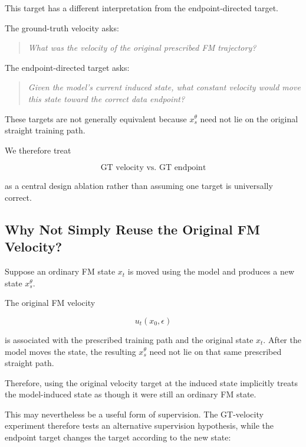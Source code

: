 \documentclass[11pt]{article}
\begin{document}
This target has a different interpretation from the endpoint-directed target.

The ground-truth velocity asks:

\begin{quote}
\emph{What was the velocity of the original prescribed FM trajectory?}
\end{quote}

The endpoint-directed target asks:

\begin{quote}
\emph{Given the model's current induced state, what constant velocity would
move this state toward the correct data endpoint?}
\end{quote}

These targets are not generally equivalent because $x_s^\theta$ need not lie on
the original straight training path.

We therefore treat

\begin{equation}
\boxed{
\text{GT velocity vs. GT endpoint}
}
\end{equation}

as a central design ablation rather than assuming one target is universally
correct.

\subsection{Why Not Simply Reuse the Original FM Velocity?}

Suppose an ordinary FM state $x_t$ is moved using the model and produces a new
state $x_s^\theta$.

The original FM velocity

\begin{equation}
u_t(x_0,\epsilon)
\end{equation}

is associated with the prescribed training path and the original state $x_t$.
After the model moves the state, the resulting $x_s^\theta$ need not lie on
that same prescribed straight path.

Therefore, using the original velocity target at the induced state implicitly
treats the model-induced state as though it were still an ordinary FM state.

This may nevertheless be a useful form of supervision. The GT-velocity
experiment therefore tests an alternative supervision hypothesis, while the
endpoint target changes the target according to the new state:
\end{document}

